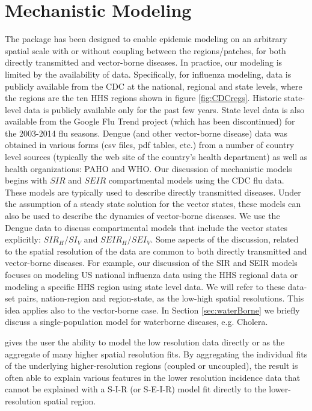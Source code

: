 \documentclass[a4paper]{article}
\begin{document}
\section{Mechanistic Modeling}
\label{sec:MechModeling}

The  package has been designed to enable epidemic modeling on an arbitrary spatial scale with or without coupling between the regions/patches, for both directly transmitted and vector-borne diseases.   In practice, our modeling is limited by the availability of data.  Specifically, for influenza modeling, data is publicly available from the CDC at the national, regional and state levels, where the regions are the ten HHS regions shown in figure \ref{fig:CDCregs}. Historic state-level data is publicly available only for the past few years.  State level data is also available from the Google Flu Trend project (which has been discontinued) for the 2003-2014 flu seasons. Dengue (and other vector-borne disease) data was obtained in various forms (csv files, pdf tables, etc.) from a number of country level sources (typically the web site of the country's health department) as well as health organizations: PAHO and WHO. Our discussion of mechanistic models begins with $SIR$ and $SEIR$ compartmental models using the CDC flu data. These models are typically used to describe directly transmitted diseases. Under the assumption of a steady state solution for the vector states, these models can also be used to describe the dynamics of vector-borne diseases.  We use the Dengue data to discuss compartmental models that include the vector states explicitly: $SIR_{H}/SI_{V}$ and $SEIR_{H}/SEI_{V}$.  Some aspects of the discussion, related to the spatial resolution of the data are common to both directly transmitted and vector-borne diseases.  For example,  our discussion of the SIR and SEIR models focuses on modeling US national influenza data using the HHS regional data or modeling a specific HHS region using state level data. We will refer to these data-set pairs, nation-region and region-state, as the low-high spatial resolutions. This idea applies also to the vector-borne case. In Section \ref{sec:waterBorne} we briefly discuss a single-population model for waterborne diseases, e.g. Cholera.


 gives the user the ability to model the low resolution data directly or as the aggregate of many higher spatial resolution fits. By aggregating the individual fits of the underlying higher-resolution regions (coupled or uncoupled), the result is often able to explain various features in the lower resolution incidence data that cannot be explained with a S-I-R (or S-E-I-R) model fit directly to the lower-resolution spatial region.
\end{document}
